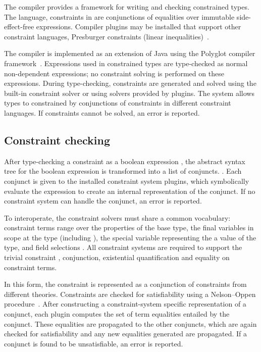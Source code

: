 %

The \Xten{} compiler provides a framework for writing and
checking constrained types.  The \Xten{} 
language, 
constraints in \Xten{} are conjunctions of equalities over immutable
side-effect-free expressions.  Compiler plugins may be installed
that support other constraint languages, Presburger
constraints (linear inequalities)~\cite{??}.

The \Xten{} compiler is implemented as an extension of
Java using the Polyglot compiler framework~\cite{ncm03}.
Expressions used in constrained
types are type-checked as normal non-dependent \Xten{} expressions;
no constraint solving is performed on these expressions.
During type-checking, constraints are generated and solved using
the built-in constraint solver or using solvers provided by
plugins.  The system allows types to constrained by conjunctions
of constraints in different constraint languages.
If constraints cannot be solved, an error is reported.

\subsection{Constraint checking}

After type-checking a constraint as a boolean expression ,
the abstract syntax tree for
the boolean expression is transformed into a list of conjuncts.
.  Each conjunct  is given to 
the installed constraint system plugins, which symbolically
evaluate the expression to create an internal representation of
the conjunct.  If no
constraint system can handle the conjunct, an error is reported.

To interoperate, the constraint solvers must share a common
vocabulary: constraint terms  range over the properties of the
base type, the final variables in scope at the type (including
), the special variable  representing
the a value of the type, and field selections .
All
constraint systems are required to support the trivial
constraint
, conjunction, existential quantification and equality on
constraint terms.


In this form, the constraint is represented as a 
conjunction of constraints from different theories.  Constraints
are checked for satisfiability using a Nelson--Oppen
procedure~\cite{nelson-oppen}.
After constructing a constraint-system specific 
representation of a conjunct, each plugin computes the set of
term equalities entailed by the conjunct.  These equalities are
propagated to the other conjuncts, which are again checked for
satisfiability and any new equalities generated are propagated.
If a conjunct is found to be unsatisfiable, an error is
reported. 

